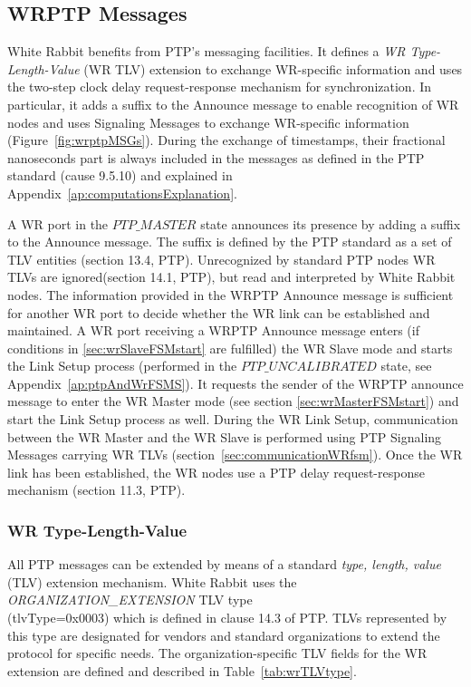 \documentclass[a4paper, 12pt]{article}
\begin{document}
\newpage

\subsection{WRPTP Messages}
\label{sec:wrMSG}

White Rabbit benefits from PTP's messaging facilities. It defines a \textit{WR Type-Length-Value} 
(WR TLV) extension to exchange WR-specific information and uses the two-step clock delay 
request-response mechanism for synchronization. In particular, it adds a suffix to the Announce 
message to enable recognition of WR nodes and uses Signaling Messages to exchange WR-specific 
information (Figure~\ref{fig:wrptpMSGs}). During the exchange of timestamps, their
fractional nanoseconds part is always included in the messages as defined in the PTP standard 
(cause 9.5.10) and explained in Appendix~\ref{ap:computationsExplanation}.

A WR port in the $PTP\_MASTER$ state announces its presence by adding a suffix to the Announce 
message. The suffix is defined by the PTP standard as a set of TLV entities (section 13.4, PTP). 
Unrecognized by standard PTP nodes WR TLVs are ignored(section 14.1, PTP), 
but read and interpreted by White Rabbit nodes. 
The information provided in the WRPTP Announce message is sufficient for another WR port to decide 
whether the WR link can be established and maintained. A WR port receiving a 
WRPTP Announce message enters (if conditions in \ref{sec:wrSlaveFSMstart} are fulfilled) 
the WR Slave mode and starts the Link Setup process (performed in the $PTP\_UNCALIBRATED$ state, 
see Appendix~\ref{ap:ptpAndWrFSMS}). It requests the sender of the WRPTP announce message 
to enter the WR Master mode (see section \ref{sec:wrMasterFSMstart}) and start 
the Link Setup process as well. During the WR Link Setup, communication between the WR Master and 
the WR Slave is performed using PTP Signaling Messages carrying WR TLVs 
(section~\ref{sec:communicationWRfsm}). Once the WR link has been established, the WR nodes use 
a PTP delay request-response mechanism (section 11.3, PTP).


\subsubsection{WR Type-Length-Value}
\label{sec:wrTLVtype}

All PTP messages can be extended by means of a standard \textit{type, length, value} (TLV) 
extension mechanism. White Rabbit uses the \textit{ORGANIZATION\_EXTENSION} TLV type \\
(tlvType=0x0003) which is defined in clause 14.3 of PTP. TLVs represented by this type 
are designated for vendors and standard organizations to extend the protocol for specific needs. 
The organization-specific TLV fields for the WR extension are defined and described in 
Table~\ref{tab:wrTLVtype}. 
\end{document}
